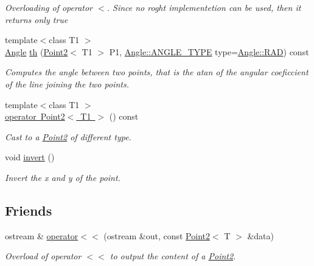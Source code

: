 \begin{DoxyCompactItemize}
\begin{DoxyCompactList}\small\item\em Overloading of operator $<$. Since no roght implementetion can be used, then it returns only {\ttfamily true} \end{DoxyCompactList}\item 
{\footnotesize template$<$class T1 $>$ }\\\mbox{\hyperlink{class_angle}{Angle}} \mbox{\hyperlink{class_point2_afe4e1b27eb2a47f6f98695d0b715a044}{th}} (\mbox{\hyperlink{class_point2}{Point2}}$<$ T1 $>$ P1, \mbox{\hyperlink{class_angle_a4f7b9849ce8780bcba95ca3ee45cff77}{Angle\+::\+A\+N\+G\+L\+E\+\_\+\+T\+Y\+PE}} type=\mbox{\hyperlink{class_angle_a4f7b9849ce8780bcba95ca3ee45cff77a93ab6b68075fd7a6fe724fbde5b13c1f}{Angle\+::\+R\+AD}}) const
\begin{DoxyCompactList}\small\item\em Computes the angle between two points, that is the atan of the angular coeficcient of the line joining the two points. \end{DoxyCompactList}\item 
{\footnotesize template$<$class T1 $>$ }\\\mbox{\hyperlink{class_point2_a3af3e22d9650f7bde9dd9deeb043dffa}{operator Point2$<$ T1 $>$}} () const
\begin{DoxyCompactList}\small\item\em Cast to a \mbox{\hyperlink{class_point2}{Point2}} of different type. \end{DoxyCompactList}\item 
void \mbox{\hyperlink{class_point2_aabc6ec4c0ed4c7757ac61a9448195c97}{invert}} ()
\begin{DoxyCompactList}\small\item\em Invert the x and y of the point. \end{DoxyCompactList}\end{DoxyCompactItemize}
\subsection*{Friends}
\begin{DoxyCompactItemize}
\item 
ostream \& \mbox{\hyperlink{class_point2_a9156326af6248209210a7bd67569e5c2}{operator$<$$<$}} (ostream \&out, const \mbox{\hyperlink{class_point2}{Point2}}$<$ T $>$ \&data)
\begin{DoxyCompactList}\small\item\em Overload of operator $<$$<$ to output the content of a {\ttfamily \mbox{\hyperlink{class_point2}{Point2}}}. \end{DoxyCompactList}\end{DoxyCompactItemize}


